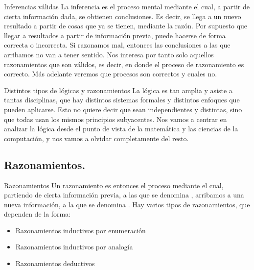 
\begin{frame}{Inferencias válidas}
  La inferencia es el proceso mental mediante el cual, a partir de cierta
  información dada, se obtienen conclusiones. Es decir, se llega a un nuevo
  resultado a partir de cosas que ya se tienen, mediante la razón.
  \jump
  Por supuesto que llegar a resultados a partir de información previa,
  puede hacerse de forma correcta o incorrecta. Si razonamos mal, entonces
  las conclusiones a las que arribamos no van a tener sentido.
  \jump
  Nos interesa por tanto solo aquellos razonamientos que son válidos, es decir,
  en donde el proceso de razonamiento es correcto. Más adelante veremos que
  procesos son correctos y cuales no.
\end{frame}


\begin{frame}{Distintos tipos de lógicas y razonamientos}
  La lógica es tan amplia y asiste a tantas disciplinas, que hay distintos
  sistemas formales y distintos enfoques que pueden aplicarse.
  \jump
  Esto no quiere decir que sean independientes y distintas, sino que todas usan
  los mismos principios subyacentes.
  \jump
  Nos vamos a centrar en analizar la lógica desde el punto de vista de la
  matemática y las ciencias de la computación, y nos vamos a olvidar
  completamente del resto.
\end{frame}


\subsection{Razonamientos.}


\begin{frame}{Razonamientos}
  Un razonamiento es entonces el proceso mediante el cual, partiendo de cierta
  información previa, a las que se denomina , arribamos a una
  nueva información, a la que se denomina .
  \jump
  Hay varios tipos de razonamientos, que dependen de la forma:
  \begin{itemize}
    \item Razonamientos inductivos por enumeración
    \item Razonamientos inductivos por analogía
    \item Razonamientos deductivos
  \end{itemize}
\end{frame}

